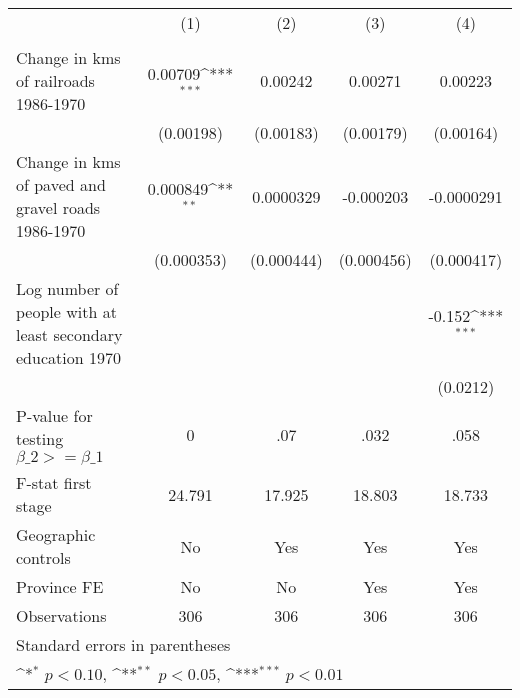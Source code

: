 {
\def\sym#1{\ifmmode^{#1}\else\(^{#1}\)\fi}
\begin{tabular}{l*{4}{c}}
\hline\hline
                &\multicolumn{1}{c}{(1)}&\multicolumn{1}{c}{(2)}&\multicolumn{1}{c}{(3)}&\multicolumn{1}{c}{(4)}\\
                &\multicolumn{1}{c}{}&\multicolumn{1}{c}{}&\multicolumn{1}{c}{}&\multicolumn{1}{c}{}\\
\hline
Change in kms of railroads 1986-1970&  0.00709\sym{***}&  0.00242         &  0.00271         &  0.00223         \\
                &(0.00198)         &(0.00183)         &(0.00179)         &(0.00164)         \\
[1em]
Change in kms of paved and gravel roads 1986-1970& 0.000849\sym{**} &0.0000329         &-0.000203         &-0.0000291         \\
                &(0.000353)         &(0.000444)         &(0.000456)         &(0.000417)         \\
[1em]
Log number of people with at least secondary education 1970&                  &                  &                  &   -0.152\sym{***}\\
                &                  &                  &                  & (0.0212)         \\
\hline
P-value for testing $\beta\_{2} >= \beta\_{1}$&        0         &      .07         &     .032         &     .058         \\
F-stat first stage&   24.791         &   17.925         &   18.803         &   18.733         \\
Geographic controls&       No         &      Yes         &      Yes         &      Yes         \\
Province FE     &       No         &       No         &      Yes         &      Yes         \\
Observations    &      306         &      306         &      306         &      306         \\
\hline\hline
\multicolumn{5}{l}{\footnotesize Standard errors in parentheses}\\
\multicolumn{5}{l}{\footnotesize \sym{*} \(p<0.10\), \sym{**} \(p<0.05\), \sym{***} \(p<0.01\)}\\
\end{tabular}
}
